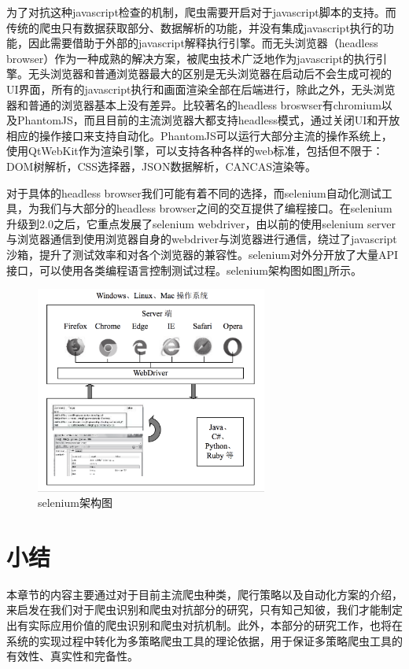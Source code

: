 \documentclass[doctor,privacy,twoside]{buaa_mac}
\begin{document}
为了对抗这种javascript检查的机制，爬虫需要开启对于javascript脚本的支持。而传统的爬虫只有数据获取部分、数据解析的功能，并没有集成javascript执行的功能，因此需要借助于外部的javascript解释执行引擎。而无头浏览器（headless browser）作为一种成熟的解决方案，被爬虫技术广泛地作为javascript的执行引擎。无头浏览器和普通浏览器最大的区别是无头浏览器在启动后不会生成可视的UI界面，所有的javascript执行和画面渲染全部在后端进行，除此之外，无头浏览器和普通的浏览器基本上没有差异。比较著名的headless broswser有chromium以及PhantomJS，而且目前的主流浏览器大都支持headless模式，通过关闭UI和开放相应的操作接口来支持自动化。PhantomJS可以运行大部分主流的操作系统上，使用QtWebKit作为渲染引擎，可以支持各种各样的web标准，包括但不限于：DOM树解析，CSS选择器，JSON数据解析，CANCAS渲染等。

对于具体的headless browser我们可能有着不同的选择，而selenium自动化测试工具，为我们与大部分的headless browser之间的交互提供了编程接口。在selenium升级到2.0之后，它重点发展了selenium webdriver，由以前的使用selenium server与浏览器通信到使用浏览器自身的webdriver与浏览器进行通信，绕过了javascript沙箱，提升了测试效率和对各个浏览器的兼容性。selenium对外分开放了大量API接口，可以使用各类编程语言控制测试过程。selenium架构图如图\ref{fig:selenium}所示。


\centerline{}
\begin{figure}[!h]
  \centering
  \includegraphics[width=0.68\textwidth]{images/selenium.png}
  \caption{selenium架构图}
  \label{fig:selenium}
\end{figure}


\section{小结}
本章节的内容主要通过对于目前主流爬虫种类，爬行策略以及自动化方案的介绍，来启发在我们对于爬虫识别和爬虫对抗部分的研究，只有知己知彼，我们才能制定出有实际应用价值的爬虫识别和爬虫对抗机制。此外，本部分的研究工作，也将在系统的实现过程中转化为多策略爬虫工具的理论依据，用于保证多策略爬虫工具的有效性、真实性和完备性。
\end{document}
